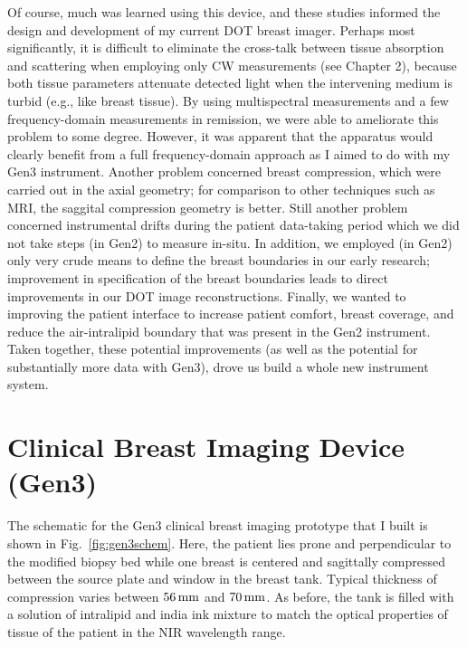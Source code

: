 Of course, much was learned using this device, and these studies informed the design and development of my current DOT breast imager. Perhaps most significantly, it is difficult to eliminate the cross-talk between tissue absorption and scattering when employing only CW measurements (see Chapter 2), because both tissue parameters attenuate detected light when the intervening medium is turbid (e.g., like breast tissue). By using multispectral measurements and a few frequency-domain measurements in remission, we were able to ameliorate this problem to some degree. However, it was apparent that the apparatus would clearly benefit from a full frequency-domain approach as I aimed to do with my Gen3 instrument. Another problem concerned breast compression, which were carried out in the axial geometry; for comparison to other techniques such as MRI, the saggital compression geometry is better. Still another problem concerned instrumental drifts during the patient data-taking period which we did not take steps (in Gen2) to measure in-situ. In addition, we employed (in Gen2) only very crude means to define the breast boundaries in our early research; improvement in specification of the breast boundaries leads to direct improvements in our DOT image reconstructions. Finally, we wanted to improving the patient interface to increase patient comfort, breast coverage, and reduce the air-intralipid boundary that was present in the Gen2 instrument. Taken together, these potential improvements (as well as the potential for substantially more data with Gen3), drove us build a whole new instrument system.

\section{Clinical Breast Imaging Device (Gen3)}
The schematic for the Gen3 clinical breast imaging prototype that I built is shown in Fig.~\ref{fig:gen3schem}. Here, the patient lies prone and perpendicular to the modified biopsy bed while one breast is centered and sagittally compressed between the source plate and window in the breast tank. Typical thickness of compression varies between $56\,{\rm mm}$ and $70\,{\rm mm}$. As before, the tank is filled with a solution of intralipid and india ink mixture to match the optical properties of tissue of the patient in the NIR wavelength range.

